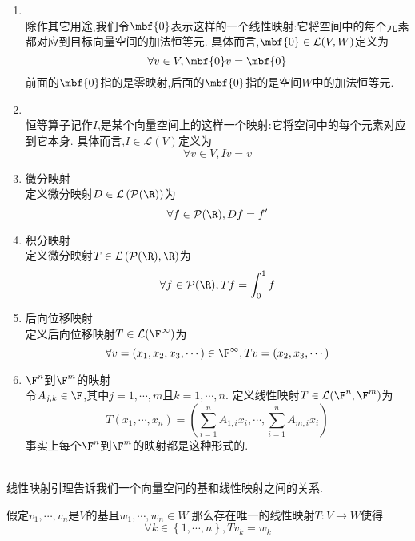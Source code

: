 \documentclass{ctexart}
\begin{document}
\begin{problem}[1.3 例:线性映射]
    \begin{enumerate}[label=\tbf{(\alph*)}]
        \item {}\\
            除作其它用途,我们令$\mbf{0}$表示这样的一个线性映射:它将空间中的每个元素都对应到目标向量空间的加法恒等元.
            具体而言,$\mbf{0}\in\mathcal{L}(V,W)$定义为
            $$\forall v\in V,\mbf{0}v=\mbf{0}$$
            前面的$\mbf{0}$指的是零映射,后面的$\mbf{0}$指的是空间$W$中的加法恒等元.
        \item {}\\
            恒等算子记作$I$,是某个向量空间上的这样一个映射:它将空间中的每个元素对应到它本身.
            具体而言,$I\in\mathcal{L}(V)$定义为
            $$\forall v\in V,Iv=v$$
        \item 微分映射\\
            定义微分映射$D\in\mathcal{L}\left(\mathcal{P}(\R)\right)$为
            $$\forall f\in\mathcal{P}(\R),Df=f'$$
        \item 积分映射\\
            定义微分映射$T\in\mathcal{L}\left(\mathcal{P}(\R),\R\right)$为
            $$\forall f\in\mathcal{P}(\R),Tf=\int_{0}^{1}f$$
        \item 后向位移映射\\
            定义后向位移映射$T\in\mathcal{L}(\F^\infty)$为
            $$\forall v=(x_1,x_2,x_3,\cdots)\in\F^\infty,Tv=(x_2,x_3,\cdots)$$
        \item $\F^n$到$\F^m$的映射\\
            令$A_{j,k}\in\F$,其中$j=1,\cdots,m$且$k=1,\cdots,n$.
            定义线性映射$T\in\mathcal{L}(\F^n,\F^m)$为
            $$T(x_1,\cdots,x_n)=\left(\sum_{i=1}^{n}A_{1,i}x_i,\cdots,\sum_{i=1}^{n}A_{m,i}x_i\right)$$
            事实上每个$\F^n$到$\F^m$的映射都是这种形式的.
    \end{enumerate}
\end{problem}\noindent
{}\\
线性映射引理告诉我们一个向量空间的基和线性映射之间的关系.
\begin{formal}[2.1 线性映射引理]
    假定$v_1,\cdots,v_n$是$V$的基且$w_1,\cdots,w_n\in W$.那么存在唯一的线性映射$T:V\to W$使得
    $$\forall k\in\left\{1,\cdots,n\right\},Tv_k=w_k$$
\end{formal}
\end{document}
